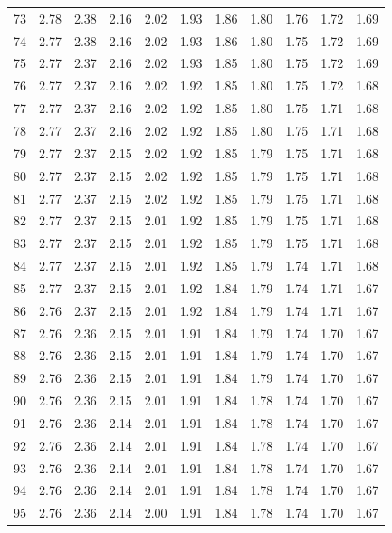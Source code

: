 \documentclass[
]{book}
\theoremstyle{definition}
\theoremstyle{definition}
\theoremstyle{definition}
\theoremstyle{definition}
\theoremstyle{remark}
\begin{document}
\begin{longtable}[]{@{}ccccccccccc@{}}
73 & 2.78 & 2.38 & 2.16 & 2.02 & 1.93 & 1.86 & 1.80 & 1.76 & 1.72 & 1.69 \\
74 & 2.77 & 2.38 & 2.16 & 2.02 & 1.93 & 1.86 & 1.80 & 1.75 & 1.72 & 1.69 \\
75 & 2.77 & 2.37 & 2.16 & 2.02 & 1.93 & 1.85 & 1.80 & 1.75 & 1.72 & 1.69 \\
76 & 2.77 & 2.37 & 2.16 & 2.02 & 1.92 & 1.85 & 1.80 & 1.75 & 1.72 & 1.68 \\
77 & 2.77 & 2.37 & 2.16 & 2.02 & 1.92 & 1.85 & 1.80 & 1.75 & 1.71 & 1.68 \\
78 & 2.77 & 2.37 & 2.16 & 2.02 & 1.92 & 1.85 & 1.80 & 1.75 & 1.71 & 1.68 \\
79 & 2.77 & 2.37 & 2.15 & 2.02 & 1.92 & 1.85 & 1.79 & 1.75 & 1.71 & 1.68 \\
80 & 2.77 & 2.37 & 2.15 & 2.02 & 1.92 & 1.85 & 1.79 & 1.75 & 1.71 & 1.68 \\
81 & 2.77 & 2.37 & 2.15 & 2.02 & 1.92 & 1.85 & 1.79 & 1.75 & 1.71 & 1.68 \\
82 & 2.77 & 2.37 & 2.15 & 2.01 & 1.92 & 1.85 & 1.79 & 1.75 & 1.71 & 1.68 \\
83 & 2.77 & 2.37 & 2.15 & 2.01 & 1.92 & 1.85 & 1.79 & 1.75 & 1.71 & 1.68 \\
84 & 2.77 & 2.37 & 2.15 & 2.01 & 1.92 & 1.85 & 1.79 & 1.74 & 1.71 & 1.68 \\
85 & 2.77 & 2.37 & 2.15 & 2.01 & 1.92 & 1.84 & 1.79 & 1.74 & 1.71 & 1.67 \\
86 & 2.76 & 2.37 & 2.15 & 2.01 & 1.92 & 1.84 & 1.79 & 1.74 & 1.71 & 1.67 \\
87 & 2.76 & 2.36 & 2.15 & 2.01 & 1.91 & 1.84 & 1.79 & 1.74 & 1.70 & 1.67 \\
88 & 2.76 & 2.36 & 2.15 & 2.01 & 1.91 & 1.84 & 1.79 & 1.74 & 1.70 & 1.67 \\
89 & 2.76 & 2.36 & 2.15 & 2.01 & 1.91 & 1.84 & 1.79 & 1.74 & 1.70 & 1.67 \\
90 & 2.76 & 2.36 & 2.15 & 2.01 & 1.91 & 1.84 & 1.78 & 1.74 & 1.70 & 1.67 \\
91 & 2.76 & 2.36 & 2.14 & 2.01 & 1.91 & 1.84 & 1.78 & 1.74 & 1.70 & 1.67 \\
92 & 2.76 & 2.36 & 2.14 & 2.01 & 1.91 & 1.84 & 1.78 & 1.74 & 1.70 & 1.67 \\
93 & 2.76 & 2.36 & 2.14 & 2.01 & 1.91 & 1.84 & 1.78 & 1.74 & 1.70 & 1.67 \\
94 & 2.76 & 2.36 & 2.14 & 2.01 & 1.91 & 1.84 & 1.78 & 1.74 & 1.70 & 1.67 \\
95 & 2.76 & 2.36 & 2.14 & 2.00 & 1.91 & 1.84 & 1.78 & 1.74 & 1.70 & 1.67 \\

\end{longtable}
\end{document}
